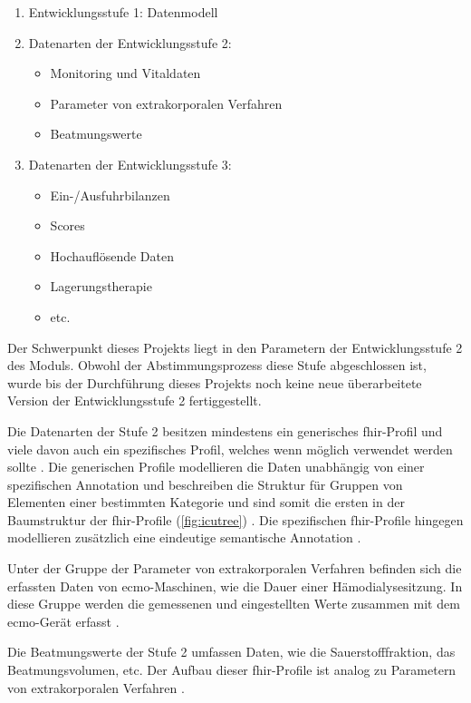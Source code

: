 \begin{enumerate}
	\item Entwicklungsstufe 1: Datenmodell
	\item Datenarten der Entwicklungsstufe 2:
	\begin{itemize}
		\item Monitoring und Vitaldaten
		\item Parameter von extrakorporalen Verfahren
		\item Beatmungswerte
	\end{itemize}
	\item Datenarten der Entwicklungsstufe 3:
	\begin{itemize}
		\item Ein-/Ausfuhrbilanzen
		\item Scores
		\item Hochauflösende Daten
		\item Lagerungstherapie
		\item etc.
	\end{itemize}
\end{enumerate}

 Der Schwerpunkt dieses Projekts liegt in den Parametern der Entwicklungsstufe 2 des Moduls. Obwohl der Abstimmungsprozess diese Stufe abgeschlossen ist, wurde bis der Durchführung dieses Projekts noch keine neue überarbeitete Version der Entwicklungsstufe 2 fertiggestellt.

 Die Datenarten der Stufe 2 besitzen mindestens ein generisches \ac{fhir}-Profil und viele davon auch ein spezifisches Profil, welches wenn möglich verwendet werden sollte \cite{icukdz, modicuvid}. Die generischen Profile modellieren die Daten unabhängig von einer spezifischen Annotation und beschreiben die Struktur für Gruppen von Elementen einer bestimmten Kategorie und sind somit die ersten in der Baumstruktur der \ac{fhir}-Profile (\ref{fig:icutree}) \cite{icukdz}. Die spezifischen \ac{fhir}-Profile hingegen modellieren zusätzlich eine eindeutige semantische Annotation \cite{modicuvid}.
 
 Unter der Gruppe der Parameter von extrakorporalen Verfahren befinden sich die erfassten Daten von \ac{ecmo}-Maschinen, wie die Dauer einer Hämodialysesitzung. In diese Gruppe werden die gemessenen und eingestellten Werte zusammen mit dem \ac{ecmo}-Gerät erfasst \cite{icukdz}. 
 
 Die Beatmungswerte der Stufe 2 umfassen Daten, wie die Sauerstofffraktion, das Beatmungsvolumen, etc. Der Aufbau dieser \ac{fhir}-Profile ist analog zu Parametern von extrakorporalen Verfahren \cite{icukdz}.

